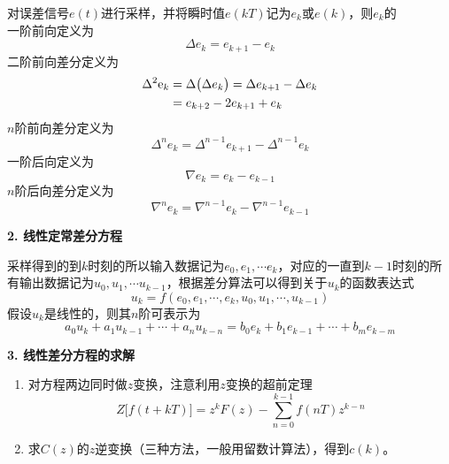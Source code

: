 对误差信号$e(t)$进行采样，并将瞬时值$e(kT)$记为$e_k$或$e(k)$，则$e_k$的\\[0.5em]
一阶前向定义为
\begin{equation}
	\Delta e_k = e_{k+1} - e_k
\end{equation}
二阶前向差分定义为
\begin{align}
	\Delta^2 {\rm{e}}_k &= \Delta\big(\Delta e_k\big) = \Delta e_{k+1} - \Delta e_k \notag\\
	&=e_{k+2} - 2e_{k+1}  + e_k
\end{align}
$n$阶前向差分定义为
\begin{equation}
	\Delta^n e_k = \Delta^{n-1}e_{k+1} - \Delta^{n-1}e_k
\end{equation}
一阶后向定义为
\begin{equation}
	\nabla e_k = e_{k} - e_{k-1}
\end{equation}
$n$阶后向差分定义为
\begin{equation}
	\nabla^n e_k = \nabla^{n-1}e_{k} - \nabla^{n-1}e_{k-1}
\end{equation}

\noindent \textbf{2. 线性定常差分方程}

采样得到的到$k$时刻的所以输入数据记为$e_0,e_1,\cdots e_k$，对应的一直到$k-1$时刻的所有输出数据记为$u_0,u_1,\cdots u_{k-1}$，根据差分算法可以得到关于$u_k$的函数表达式
\begin{equation}
	u_k = f(e_0,e_1,\cdots, e_k,u_0,u_1,\cdots, u_{k-1})
\end{equation}
假设$u_k$是线性的，则其$n$阶可表示为
\begin{equation}
	a_0u_k+a_1u_{k-1}+\cdots+a_nu_{k-n} = b_0e_k+b_1e_{k-1}+\cdots + b_me_{k-m}
\end{equation}

\noindent \textbf{3. 线性差分方程的求解}

\example[求解线性差分方程]\vspace*{0.5em}
\noindent  \hspace*{0.2em}  \hspace{1.5em}
\vspace*{0.5em}
\begin{enumerate}
	\item 对方程两边同时做$z$变换，注意利用$z$变换的超前定理
	\[
	Z\big[f(t+kT)\big] = z^kF(z) - \sum_{n = 0}^{k - 1} f(nT)z^{k-n}
	\]
	\item 求$C(z)$的$z$逆变换（三种方法，一般用留数计算法），得到$c(k)$。
\end{enumerate}


